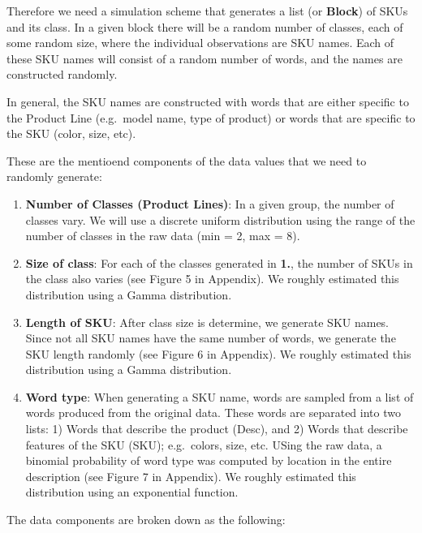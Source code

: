 \documentclass[]{article}
\providecommand{\tightlist}{%
  \setlength{\itemsep}{0pt}\setlength{\parskip}{0pt}}
\begin{document}
Therefore we need a simulation scheme that generates a list (or
\textbf{Block}) of SKUs and its class. In a given block there will be a
random number of classes, each of some random size, where the individual
observations are SKU names. Each of these SKU names will consist of a
random number of words, and the names are constructed randomly.

In general, the SKU names are constructed with words that are either
specific to the Product Line (e.g.~model name, type of product) or words
that are specific to the SKU (color, size, etc).

These are the mentioend components of the data values that we need to
randomly generate:

\begin{enumerate}
\def\labelenumi{\arabic{enumi}.}
\tightlist
\item
  \textbf{Number of Classes (Product Lines)}: In a given group, the
  number of classes vary. We will use a discrete uniform distribution
  using the range of the number of classes in the raw data (min = 2, max
  = 8).
\item
  \textbf{Size of class}: For each of the classes generated in
  \textbf{1.}, the number of SKUs in the class also varies (see Figure 5
  in Appendix). We roughly estimated this distribution using a Gamma
  distribution.
\item
  \textbf{Length of SKU}: After class size is determine, we generate SKU
  names. Since not all SKU names have the same number of words, we
  generate the SKU length randomly (see Figure 6 in Appendix). We
  roughly estimated this distribution using a Gamma distribution.
\item
  \textbf{Word type}: When generating a SKU name, words are sampled from
  a list of words produced from the original data. These words are
  separated into two lists: 1) Words that describe the product (Desc),
  and 2) Words that describe features of the SKU (SKU); e.g.~colors,
  size, etc. USing the raw data, a binomial probability of word type was
  computed by location in the entire description (see Figure 7 in
  Appendix). We roughly estimated this distribution using an exponential
  function.
\end{enumerate}

The data components are broken down as the following:
\end{document}
